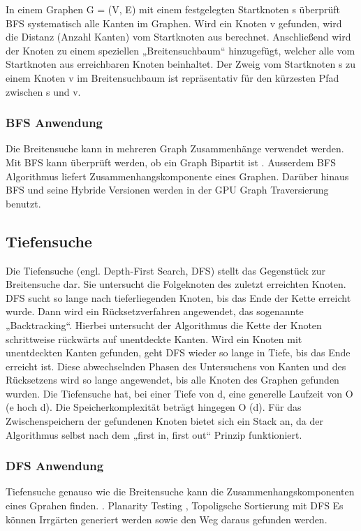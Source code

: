 In einem Graphen G = (V, E) mit einem festgelegten Startknoten s überprüft BFS systematisch alle Kanten im Graphen. Wird ein Knoten v gefunden, wird die Distanz (Anzahl Kanten) vom Startknoten aus berechnet. Anschließend wird der Knoten zu einem speziellen „Breitensuchbaum“ hinzugefügt, welcher alle vom Startknoten aus erreichbaren Knoten beinhaltet. Der Zweig vom Startknoten s zu einem Knoten v im Breitensuchbaum ist repräsentativ für den kürzesten Pfad zwischen s und v\cite{Cormen.2009}.

\subsubsection{BFS Anwendung}
Die Breitensuche kann in mehreren Graph Zusammenhänge verwendet werden.  Mit BFS kann überprüft werden, ob ein Graph Bipartit ist \cite{propTest}. Ausserdem BFS Algorithmus liefert Zusammenhangskomponente eines Graphen\cite{schmitz}. Darüber hinaus BFS und seine Hybride Versionen\cite{effHyb} werden in der GPU Graph Traversierung benutzt\cite{scaleGPU}. 

\subsection{Tiefensuche}

Die Tiefensuche (engl. Depth-First Search, DFS) stellt das Gegenstück zur Breitensuche dar. Sie untersucht die Folgeknoten des zuletzt erreichten Knoten. DFS sucht so lange nach tieferliegenden Knoten, bis das Ende der Kette erreicht wurde. Dann wird ein Rücksetzverfahren angewendet, das sogenannte „Backtracking“\cite{Tarjan.1972}. Hierbei untersucht der Algorithmus die Kette der Knoten schrittweise rückwärts auf unentdeckte Kanten. Wird ein Knoten mit unentdeckten Kanten gefunden, geht DFS wieder so lange in Tiefe, bis das Ende erreicht ist. Diese abwechselnden Phasen des Untersuchens von Kanten und des Rücksetzens wird so lange angewendet, bis alle Knoten des Graphen gefunden wurden\cite{Korf.1985}\cite{Cormen.2009}. Die Tiefensuche hat, bei einer Tiefe von d, eine generelle Laufzeit von O (e hoch d). Die Speicherkomplexität beträgt hingegen O (d)\cite{Korf.1985}. Für das Zwischenspeichern der gefundenen Knoten bietet sich ein Stack an, da der Algorithmus selbst nach dem „first in, first out“ Prinzip funktioniert\cite{Tarjan.1972}.  


\subsubsection{DFS Anwendung}
Tiefensuche genauso wie die Breitensuche kann die Zusammenhangskomponenten eines Gprahen finden. \cite{schmitz} \cite{dfs}.  Planarity Testing \cite{dfsPlanar}, Topoligsche Sortierung mit DFS
Es können Irrgärten generiert werden sowie den Weg daraus gefunden werden\cite{examMaze}.


